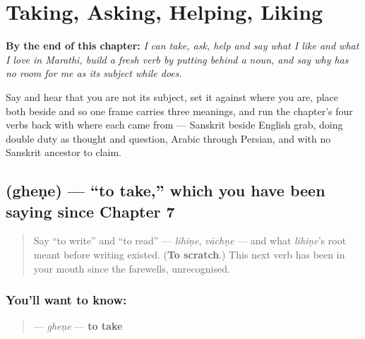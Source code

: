
\chapter{Taking, Asking, Helping, Liking}
\label{ch:mr-doing-verbs}

\begin{chapteropening}
\textbf{By the end of this chapter:} \emph{I can take, ask, help and say what I like and what I love in Marathi, build a fresh verb by putting  behind a noun, and say why    has no room for me as its subject while    does.}

Say    and hear that you are not its subject, set it against    where you are, place both beside    and    so one frame carries three meanings, and run the chapter's four verbs back with where each came from — Sanskrit  beside English grab,  doing double duty as thought and question, Arabic  through Persian, and  with no Sanskrit ancestor to claim.
\end{chapteropening}

\section[gheṇe]{ (gheṇe) — \textquotedblleft{}to take,\textquotedblright{} which you have been saying since Chapter 7}

\label{lesson:MR-C09-ghene}



\begin{quote}
Say \textquotedblleft{}to write\textquotedblright{} and \textquotedblleft{}to read\textquotedblright{} — \emph{lihiṇe}, \emph{vāchṇe} — and what \emph{lihiṇe}'s root meant before writing existed. (\textbf{To scratch}.) This next verb has been in your mouth since the farewells, unrecognised.
\end{quote}

\subsection*{You'll want to know: }
\begin{quote}
\textbf{} — \emph{gheṇe} — \textbf{to take}
\end{quote}

